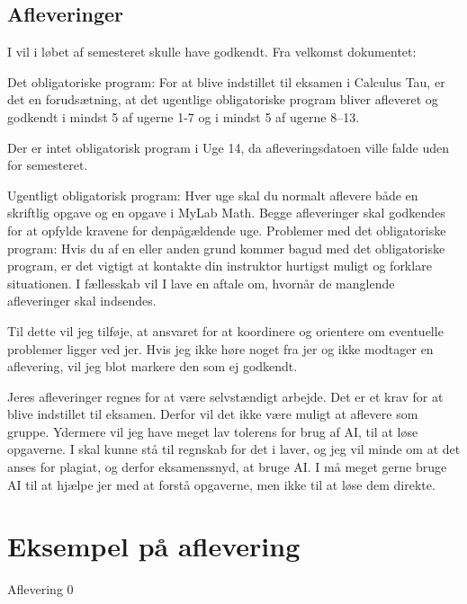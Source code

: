 \documentclass{article}
\begin{document}
\subsection*{Afleveringer}
I vil i løbet af semesteret skulle have godkendt. Fra velkomst dokumentet: \vspace{1em}

Det obligatoriske program: For at blive indstillet til eksamen i Calculus Tau, er det en forudsætning, at det ugentlige obligatoriske program bliver afleveret og godkendt i mindst 5 af ugerne 1-7 og i mindst 5 af ugerne 8–13. \vspace{1em}

Der er intet obligatorisk program i Uge 14, da afleveringsdatoen ville falde uden for semesteret.\vspace{1em}

Ugentligt obligatorisk program: Hver uge skal du normalt aflevere både en skriftlig opgave og en opgave i MyLab Math. Begge afleveringer skal godkendes for at opfylde kravene for denpågældende uge.
Problemer med det obligatoriske program: Hvis du af en eller anden grund kommer bagud med det obligatoriske program, er det vigtigt at kontakte din instruktor hurtigst muligt og forklare situationen. I fællesskab vil I lave en aftale om, hvornår de manglende afleveringer skal indsendes. \vspace{1em}

Til dette vil jeg tilføje, at ansvaret for at koordinere og orientere om eventuelle problemer ligger ved jer. Hvis jeg ikke høre noget fra jer og ikke modtager en aflevering, vil jeg blot markere den som ej godkendt. \vspace{1em}

Jeres afleveringer regnes for at være selvstændigt arbejde. Det er et krav for at blive indstillet til eksamen. Derfor vil det ikke være muligt at aflevere som gruppe. Ydermere vil jeg have meget lav tolerens for brug af AI, til at løse opgaverne. I skal kunne stå til regnskab for det i laver, og jeg vil minde om at det anses for plagiat, og derfor eksamenssnyd, at bruge AI. I må meget gerne bruge AI til at hjælpe jer med at forstå opgaverne, men ikke til at løse dem direkte.

\section*{Eksempel på aflevering}

{\center \LARGE Aflevering 0\par}
\vspace{2em}
\end{document}
